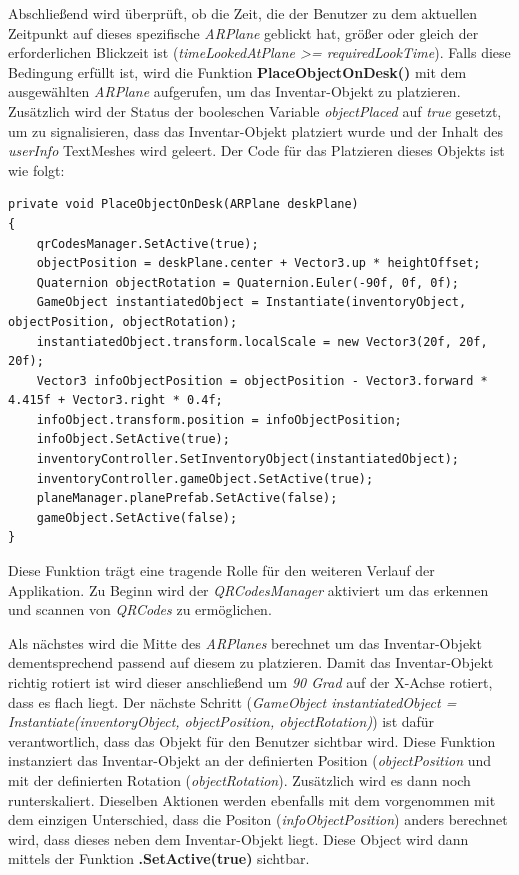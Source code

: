 Abschließend wird überprüft, ob die Zeit, die der Benutzer zu dem aktuellen Zeitpunkt auf dieses spezifische \textit{ARPlane}
geblickt hat, größer oder gleich der erforderlichen Blickzeit ist (\textit{timeLookedAtPlane >= requiredLookTime}). Falls
diese Bedingung erfüllt ist, wird die Funktion \textbf{PlaceObjectOnDesk()} mit dem ausgewählten \textit{ARPlane} aufgerufen,
um das Inventar-Objekt zu platzieren. Zusätzlich wird der Status der booleschen Variable \textit{objectPlaced} auf \textit{true}
gesetzt, um zu signalisieren, dass das Inventar-Objekt platziert wurde und der Inhalt des \textit{userInfo} TextMeshes wird
geleert. Der Code für das Platzieren dieses Objekts ist wie folgt:
\begin{lstlisting}[caption={Inventar-Objekt platzieren}, label=code:placeObject]
private void PlaceObjectOnDesk(ARPlane deskPlane)
{
    qrCodesManager.SetActive(true);
    objectPosition = deskPlane.center + Vector3.up * heightOffset;
    Quaternion objectRotation = Quaternion.Euler(-90f, 0f, 0f);
    GameObject instantiatedObject = Instantiate(inventoryObject, objectPosition, objectRotation);
    instantiatedObject.transform.localScale = new Vector3(20f, 20f, 20f);
    Vector3 infoObjectPosition = objectPosition - Vector3.forward * 4.415f + Vector3.right * 0.4f;
    infoObject.transform.position = infoObjectPosition;
    infoObject.SetActive(true);
    inventoryController.SetInventoryObject(instantiatedObject);
    inventoryController.gameObject.SetActive(true);
    planeManager.planePrefab.SetActive(false);
    gameObject.SetActive(false);
}
\end{lstlisting}
Diese Funktion trägt eine tragende Rolle für den weiteren Verlauf der Applikation. Zu Beginn wird der \textit{QRCodesManager}
aktiviert um das erkennen und scannen von \textit{QRCodes} zu ermöglichen.

Als nächstes wird die Mitte des \textit{ARPlanes} berechnet um das Inventar-Objekt dementsprechend passend auf diesem zu
platzieren. Damit das Inventar-Objekt richtig rotiert ist wird dieser anschließend um \textit{90 Grad} auf der X-Achse
rotiert, dass es flach liegt. Der nächste Schritt (\textit{GameObject instantiatedObject = Instantiate(inventoryObject, objectPosition, objectRotation)})
ist dafür verantwortlich, dass das Objekt für den Benutzer sichtbar wird. Diese Funktion instanziert das Inventar-Objekt
an der definierten Position (\textit{objectPosition} und mit der definierten Rotation (\textit{objectRotation}). Zusätzlich
wird es dann noch runterskaliert. Dieselben Aktionen werden ebenfalls mit dem  vorgenommen mit dem
einzigen Unterschied, dass die Positon (\textit{infoObjectPosition}) anders berechnet wird, dass dieses neben dem Inventar-Objekt
liegt. Diese Object wird dann mittels der Funktion \textbf{.SetActive(true)} sichtbar.\\

